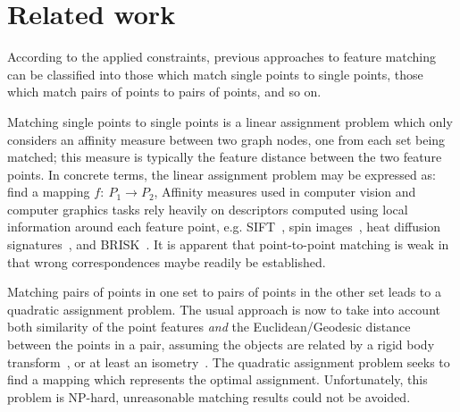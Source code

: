 \section{Related work}
\label{sec:related}

According to the applied constraints, 
previous approaches to feature matching can be classified into those which match single points to single points, those which match pairs of points to pairs of points, and so on.

Matching single points to single points is a linear assignment problem which only considers an affinity measure between two graph nodes, one from each set being matched; 
this measure is typically the feature distance between the two feature points.
In concrete terms, the linear assignment problem may be expressed as: find a mapping $f:\ P_1\to P_2$,
Affinity measures used in computer vision and computer graphics tasks rely heavily on descriptors computed using local information around each feature point,
e.g. SIFT~\cite{Lowe04}, spin images~\cite{Johnson99}, heat diffusion signatures~\cite{Sun09}, and BRISK~\cite{Leutenegger11}.
It is apparent that point-to-point matching is weak in that wrong correspondences maybe readily be established.

Matching pairs of points in one set to pairs of points in the other set leads to a quadratic assignment problem.
The usual approach is now to take into account both similarity of the point features \emph{and} the Euclidean/Geodesic distance between the points in a pair, 
assuming the objects are related by a rigid body transform~\cite{Leordeanu05}, or at least an isometry~\cite{li08,Tevs09,Ovsjanikov10,Tevs11,SahilliogluY11,Windheuser11}.
The quadratic assignment problem seeks to find a mapping which represents the optimal assignment.
Unfortunately, this problem is NP-hard, unreasonable matching results could not be avoided.


